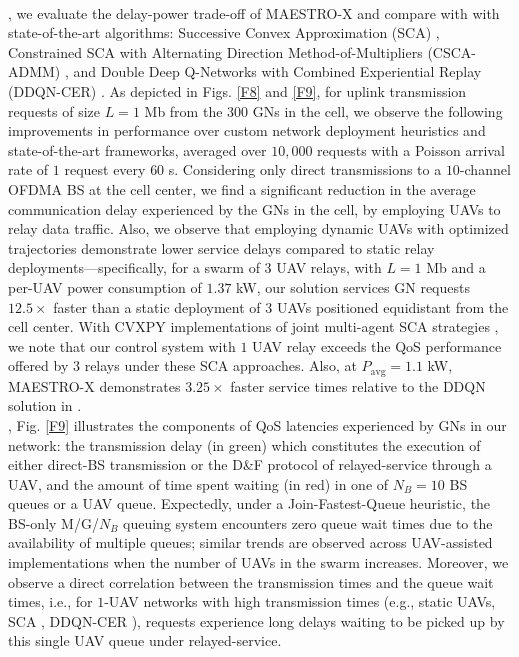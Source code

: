 \documentclass[10pt, twocolumn]{IEEEtran}
\theoremstyle{plain}
\theoremstyle{definition}
\theoremstyle{remark}
\begin{document}
\\, we evaluate the delay-power trade-off of MAESTRO-X and compare with with state-of-the-art algorithms: Successive Convex Approximation (SCA) \cite{SCA}, Constrained SCA with Alternating Direction Method-of-Multipliers (CSCA-ADMM) \cite{CSCA-ADMM}, and Double Deep Q-Networks with Combined Experiential Replay (DDQN-CER) \cite{DDQN}. As depicted in Figs. \ref{F8} and \ref{F9}, for uplink transmission requests of size $L{=}1$ Mb from the $300$ GNs in the cell, we observe the following improvements in performance over custom network deployment heuristics and state-of-the-art frameworks, averaged over $10,000$ requests with a Poisson arrival rate of $1$ request every $60$ s. Considering only direct transmissions to a $10$-channel OFDMA BS at the cell center, we find a significant reduction in the average communication delay experienced by the GNs in the cell, by employing UAVs to relay data traffic. Also, we observe that employing dynamic UAVs with optimized trajectories demonstrate lower service delays compared to static relay deployments---specifically, for a swarm of $3$ UAV relays, with $L{=}1$ Mb and a per-UAV power consumption of $1.37$ kW, our solution services GN requests $12.5{\times}$ faster than a static deployment of $3$ UAVs positioned equidistant from the cell center. With CVXPY implementations of joint multi-agent SCA strategies \cite{SCA, CSCA-ADMM}, we note that our control system with $1$ UAV relay exceeds the QoS performance offered by $3$ relays under these SCA approaches. Also, at $P_{\text{avg}}{=}1.1$ kW, MAESTRO-X demonstrates $3.25{\times}$ faster service times relative to the DDQN solution in \cite{DDQN}.\\
, Fig. \ref{F9} illustrates the components of QoS latencies experienced by GNs in our network: the transmission delay (in green) which constitutes the execution of either direct-BS transmission or the D\&F protocol of relayed-service through a UAV, and the amount of time spent waiting (in red) in one of $N_{B}{=}10$ BS queues or a UAV queue. Expectedly, under a Join-Fastest-Queue heuristic, the BS-only M/G/$N_{B}$ queuing system encounters zero queue wait times due to the availability of multiple queues; similar trends are observed across UAV-assisted implementations when the number of UAVs in the swarm increases. Moreover, we observe a direct correlation between the transmission times and the queue wait times, i.e., for $1$-UAV networks with high transmission times (e.g., static UAVs, SCA \cite{SCA}, DDQN-CER \cite{DDQN}), requests experience long delays waiting to be picked up by this single UAV queue under relayed-service.\\
\end{document}
